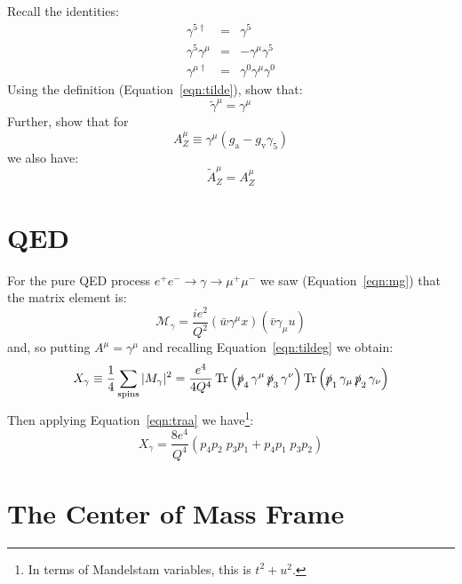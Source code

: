 \documentclass[12pt]{article}
\DeclareMathOperator{\Tr}{Tr}
\newcommand{\gv} {\ensuremath{g_{\mathrm v}}}
\newcommand{\ga} {\ensuremath{g_{\mathrm a}}}
\newcommand{\ps}{\ensuremath{\slashed{p}}}
\begin{document}
\begin{Exercise}
Recall the identities:
\begin{eqnarray*}
\gamma^{5\dagger} &=& \gamma^5 \\
\gamma^5\gamma^\mu &=& -\gamma^\mu\gamma^5 \\
\gamma^{\mu\dagger} &=& \gamma^0\gamma^\mu\gamma^0    
\end{eqnarray*}
Using the definition (Equation~\ref{eqn:tilde}), show that:
\begin{equation}
\widetilde{\gamma}^\mu = \gamma^\mu \label{eqn:tildeg}
\end{equation}
Further, show that for
\begin{equation*}
A_Z^\mu \equiv \gamma^\mu \left( \ga - \gv \gamma_5 \right)
\end{equation*}
we also have:
\begin{equation}
\widetilde{A}_Z^\mu = A_Z^\mu \label{eqn:tildez}
\end{equation}

\end{Exercise}

\section{QED}

For the pure QED process $e^+e^- \to \gamma \to \mu^+\mu^-$ we saw (Equation~\ref{eqn:mg}) that the matrix element is:
\begin{equation}
\mathcal{M}_\gamma = \frac{ie^2}{Q^2} \left( \bar{w} \gamma^\mu x \right) \left( \bar{v} \gamma_\mu u \right)
\end{equation}
and, so putting $A^\mu = \gamma^\mu$ and recalling Equation~\ref{eqn:tildeg} we obtain:
\begin{displaymath}
X_\gamma \equiv \frac{1}{4} \sum_{\rm spins} |M_\gamma|^2 = \frac{e^4}{4Q^4} \Tr\left( \ps_4 \, \gamma^\mu \, \ps_3\, \gamma^\nu \right) \Tr\left( \ps_1 \, \gamma_\mu \, \ps_2 \, \gamma_\nu \right)
\end{displaymath}
Then applying Equation~\ref{eqn:traa} we have\footnote{In terms of Mandelstam variables, this is $t^2+u^2$.}:
\begin{equation}
X_\gamma = \frac{8e^4}{Q^4} \left( p_4 p_2 \; p_3 p_1 + p_4 p_1 \; p_3 p_2 \right) \label{eqn:xg}
\end{equation}

\section{The Center of Mass Frame}
\end{document}
